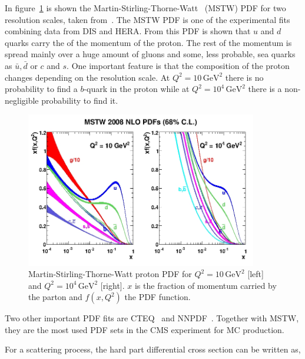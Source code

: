 In figure~\ref{fig:MSTW} is shown the Martin-Stirling-Thorne-Watt~\cite{Martin:2009iq} (MSTW) PDF for two resolution scales, taken from~\cite{Martin:2009iq}. The MSTW PDF is one of the experimental fits combining data from DIS and HERA. From this PDF is shown that $u$ and $d$ quarks carry the of the momentum of the proton. The rest of the momentum is spread mainly over a huge amount of gluons and some, less probable, sea quarks as $\bar{u}, \bar{d}$ or $c$ and $s$. One important feature is that the composition of the proton changes depending on the resolution scale. At $Q^{2}= 10\, \text{GeV}^{2}$ there is no probability to find a $b$-quark in the proton while at $Q^{2}= 10^{4}\, \text{GeV}^{2}$ there is a non-negligible probability to find it.

\begin{figure}[!Hhtbp]
  \begin{center}
    \includegraphics[width=0.9\textwidth]{figs/mstw2008nlo68cl_allpdfs.jpg}
    \caption{Martin-Stirling-Thorne-Watt proton PDF for $Q^{2}= 10\, \text{GeV}^{2}$ [left] and $Q^{2}= 10^{4}\, \text{GeV}^{2}$ [right]. $x$ is the fraction of momentum carried by the parton and $f(x,Q^{2})$ the PDF function.}
    \label{fig:MSTW}
  \end{center}
\end{figure}

Two other important PDF fits are CTEQ~\cite{Nadolsky:2008zw} and NNPDF~\cite{Ball:2010de}. Together with MSTW, they are the most used PDF sets in the CMS experiment for MC production. 

For a scattering process, the hard part differential cross section can be written as,

